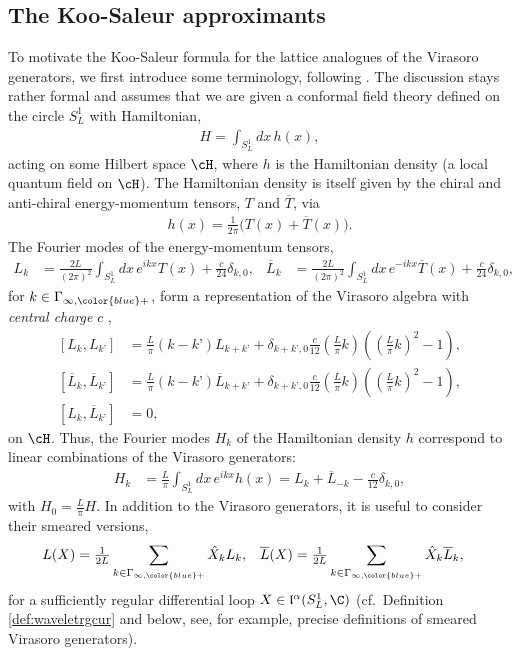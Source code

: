 \documentclass[a4paper, 11pt]{article}
\newcommand{\fl}{\mathfrak{l}}\newcommand{\cl}{\mathcal{l}}
\DeclareMathOperator{\1}{\mathds{1}}
\begin{document}
\subsection{The Koo-Saleur approximants}
\label{sec:KSapprox}
To motivate the Koo-Saleur formula for the lattice analogues of the Virasoro generators, we first introduce some terminology, following \cite{MilstedExtractionOfConformal}. The discussion stays rather formal and assumes that we are given a conformal field theory defined on the circle $S^{1}_{L}$ with Hamiltonian,
\begin{align}
\label{eq:cftH}
H = \int_{S^{1}_{L}} dx\, h(x),
\end{align}
acting on some Hilbert space $\cH$, where $h$ is the Hamiltonian density (a local quantum field on $\cH$). The Hamiltonian density is itself given by the chiral and anti-chiral energy-momentum tensors, $T$ and $\overline{T}$, via
\begin{align}
\label{eq:cftHd}
h(x) = \tfrac{1}{2\pi}\big(T(x)+\overline{T}(x)\big).
\end{align}
The Fourier modes of the energy-momentum tensors,
\begin{align}
\label{eq:vira}
L_k &\!=\!\tfrac{2L}{(2\pi)^2}\int_{S^{1}_{L}}\!dx\, e^{ikx} T(x)\!+\!\tfrac{c}{24}\delta_{k,0}, & \overline{L}_k &\!=\!\tfrac{2L}{(2\pi)^2}\int_{S^{1}_{L}}\!dx\, e^{-ikx} \overline{T}(x)\!+\!\tfrac{c}{24}\delta_{k,0},
\end{align}
for $k\in\Gamma_{\infty,{\color{blue}+}}$, form a representation of the Virasoro algebra with \emph{central charge} $c$ \cite{DiFrancescoCFTBook},
\begin{align}
\label{eq:viralg}
[L_{k}, L_{k’}] & = \tfrac{L}{\pi}(k-k’)L_{k+k’} + \delta_{k+k’,0}\tfrac{c}{12}(\tfrac{L}{\pi}k)((\tfrac{L}{\pi}k)^2-1), \\ \nonumber 
[\overline{L}_{k}, \overline{L}_{k’}] & = \tfrac{L}{\pi}(k-k’)\overline{L}_{k+k’} + \delta_{k+k’,0}\tfrac{c}{12}(\tfrac{L}{\pi}k)((\tfrac{L}{\pi}k)^2-1), \\ \nonumber
[L_{k}, \overline{L}_{k’}] & = 0,
\end{align}
on $\cH$. Thus, the Fourier modes $H_k$ of the Hamiltonian density $h$ correspond to linear combinations of the Virasoro generators:
\begin{align}
\label{eq:fourierH}
H_k & = \tfrac{L}{\pi}\int_{S^{1}_{L}}\!dx\, e^{ikx}h(x) = L_k + \overline{L}_{-k} - \tfrac{c}{12}\delta_{k,0},
\end{align}
with $H_0 = \frac{L}{\pi}H$. In addition to the Virasoro generators, it is useful to consider their smeared versions,
\begin{align}
\label{eq:virasmeared}
L(X) & = \tfrac{1}{2L}\sum_{k\in\Gamma_{\infty,{\color{blue}+}}}\hat{X}_{k}L_{k}, & \overline{L}(X) & = \tfrac{1}{2L}\sum_{k\in\Gamma_{\infty,{\color{blue}+}}}\hat{X}_{k}\overline{L}_{k},
\end{align}
for a sufficiently regular differential loop $X\in\fl^{\alpha}(S^{1}_{L},\C)$ (cf.~Definition \ref{def:waveletrgcur} and below, see, for example, \cite{GoodmanProjectiveUnitaryPositive, CarpiOnTheUniqueness} precise definitions of smeared Virasoro generators).
\end{document}
